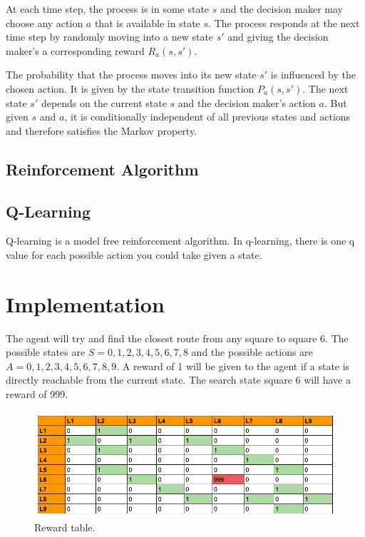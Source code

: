 \documentclass[]{article}
\begin{document}
At each time step, the process is in some state $s$ and the decision maker may choose any action $a$ that is available in state $s$. The process responds at the next time step by randomly moving into a new state $s'$ and giving the decision maker's a corresponding reward $R_a(s, s')$.

The probability that the process moves into its new state $s'$ is influenced by the chosen action. It is given by the state transition function $P_a(s, s')$. The next state $s'$ depends on the current state $s$ and the decision maker's action $a$. But given $s$ and $a$, it is conditionally independent of all previous states and actions and therefore satisfies the Markov property. 

\subsection{Reinforcement Algorithm}

\subsection{Q-Learning}

Q-learning is a model free reinforcement algorithm. In q-learning, there is one q value for each possible action you could take given a state.

\section{Implementation}

The agent will try and find the closest route from any square to square 6. The possible states are $S=0,1,2,3,4,5,6,7,8$ and the possible actions are $A=0,1,2,3,4,5,6,7,8,9$. A reward of 1 will be given to the agent if a state is directly reachable from the current state. The search state square 6 will have a reward of 999.

\begin{figure}[H]
	\includegraphics[scale=0.4]{rewards}
	\centering
	\caption{Reward table.}
\end{figure}
\end{document}
